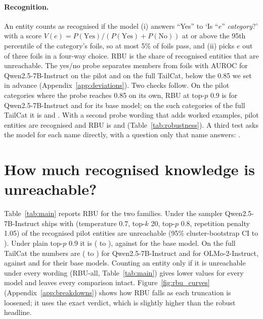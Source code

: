 \documentclass[11pt]{article}
\begin{document}
\paragraph{Recognition.} An entity counts as recognised if the model (i) answers ``Yes'' to `Is ``$e$'' \emph{category}?' with a score $V(e)=P(\text{Yes})/(P(\text{Yes})+P(\text{No}))$ at or above the 95th percentile of the category's foils, so at most 5\% of foils pass, and (ii) picks $e$ out of three foils in a four-way choice. RBU is the share of recognised entities that are unreachable. The yes/no probe separates members from foils with AUROC \gzQwenInstAuroc{} for Qwen2.5-7B-Instruct on the pilot and \ptAurocQwenInst{} on the full TailCat, below the 0.85 we set in advance (Appendix~\ref{app:deviations}). Two checks follow. On the \rcPilotQwenPassN{} pilot categories where the probe reaches 0.85 on its own, RBU at top-$p$ 0.9 is \rcPilotQwenInstPass{} for Qwen2.5-7B-Instruct and \rcPilotQwenBasePass{} for its base model; on the \rcFullQwenPassN{} such categories of the full TailCat it is \rcFullQwenInstPass{} and \rcFullQwenBasePass{}. With a second probe wording that adds worked examples, \rcProbeTwoRecognised{} pilot entities are recognised and RBU is \rcProbeTwoQwenInst{} and \rcProbeTwoQwenBase{} (Table~\ref{tab:robustness}). A third test asks the model for each name directly, with a question only that name answers: \pdAskDirectly{}.

\section{How much recognised knowledge is unreachable?}\label{sec:howmuch}

Table~\ref{tab:main} reports RBU for the two families. Under the sampler Qwen2.5-7B-Instruct ships with (temperature 0.7, top-$k$ 20, top-$p$ 0.8, repetition penalty 1.05) \gzQwenInstShipped{} of the recognised pilot entities are unreachable (95\% cluster-bootstrap CI \gzQwenInstShippedLo{} to \gzQwenInstShippedHi{}). Under plain top-$p$ 0.9 it is \gzQwenInstPnine{} (\gzQwenInstPnineLo{} to \gzQwenInstPnineHi{}), against \gzQwenBasePnine{} for the base model. On the full TailCat the numbers are \ptRbuQwenInst{} (\ptRbuQwenInstLo{} to \ptRbuQwenInstHi{}) for Qwen2.5-7B-Instruct and \ptRbuOlmoInst{} for OLMo-2-Instruct, against \ptRbuQwenBase{} and \ptRbuOlmoBase{} for their base models. Counting an entity only if it is unreachable under every wording (RBU-all, Table~\ref{tab:main}) gives lower values for every model and leaves every comparison intact. Figure~\ref{fig:rbu_curves} (Appendix~\ref{app:breakdowns}) shows how RBU falls as each truncation is loosened; it uses the exact verdict, which is slightly higher than the robust headline.
\end{document}
